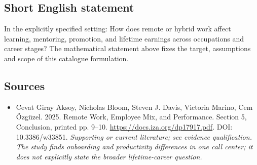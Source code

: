 \documentclass[11pt]{article}
\begin{document}
\subsection{Short English statement}
In the explicitly specified setting: How does remote or hybrid work affect learning, mentoring, promotion, and lifetime earnings across occupations and career stages? The mathematical statement above fixes the target, assumptions and scope of this catalogue formulation.

\subsection{Sources}
\begin{itemize}\raggedright
\item[\textnormal{[S1]}]\hypertarget{source:30007640:1}{} Cevat Giray Aksoy, Nicholas Bloom, Steven J. Davis, Victoria Marino, Cem Özgüzel. 2025. Remote Work, Employee Mix, and Performance. Section 5, Conclusion, printed pp. 9–10.
\url{https://docs.iza.org/dp17917.pdf}.
DOI: 10.3386/w33851.
{\small\textit{Supporting or current literature; see evidence qualification. The study finds onboarding and productivity differences in one call center; it does not explicitly state the broader lifetime-career question.}}
\end{itemize}
\end{document}
